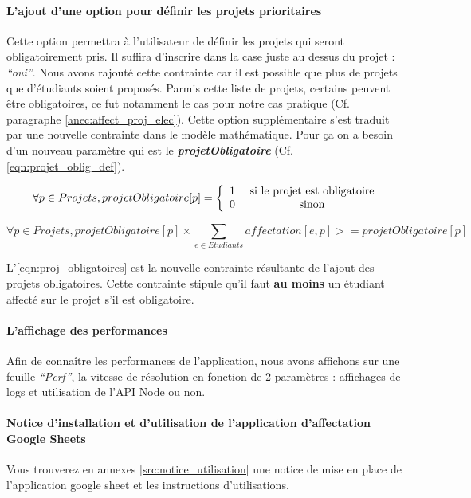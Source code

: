 \documentclass[final,poster]{polytech/polytech}
\begin{document}
\paragraph{L'ajout d'une option pour définir les projets prioritaires}
Cette option permettra à l'utilisateur de définir les projets qui seront obligatoirement pris. Il suffira d'inscrire dans la case juste au dessus du projet : \textit{“oui”}. 
Nous avons rajouté cette contrainte car il est possible que plus de projets que d'étudiants soient proposés. Parmis cette liste de projets, certains peuvent être obligatoires, ce fut notamment le cas pour notre cas pratique (Cf. paragraphe \autoref{anec:affect_proj_elec}).
Cette option supplémentaire s'est traduit par une nouvelle contrainte dans le modèle mathématique. Pour ça on a besoin d'un nouveau paramètre qui est le \textbf{\textit{projetObligatoire}} (Cf. \autoref{eqn:projet_oblig_def}).

\begin{equation}
\forall {p \in Projets}, projetObligatoire[p]=
\left\lbrace
\begin{array}{c c }
1 & \text{ si le projet est obligatoire} \\
0 & \text{ sinon}
\end{array}
\right.
\label{eqn:projet_oblig_def}
\end{equation}

\begin{equation}
\forall {p \in Projets}, projetObligatoire[p]\times\sum_{e \in Etudiants} affectation[e,p] >=projetObligatoire[p]
\label{eqn:proj_obligatoires}
\end{equation}


L'\autoref{eqn:proj_obligatoires} est la nouvelle contrainte résultante de l'ajout des projets obligatoires. Cette contrainte stipule qu'il faut \textbf{au moins} un étudiant affecté sur le projet s'il est obligatoire.

\paragraph{L'affichage des performances}
Afin de connaître les performances de l'application, nous avons affichons sur une feuille \textit{“Perf”}, la vitesse de résolution en fonction de 2 paramètres : affichages de logs et utilisation de l’API Node ou non.


\paragraph{Notice d'installation et d'utilisation de l'application d'affectation Google Sheets}
Vous trouverez en annexes \autoref{src:notice_utilisation} une notice de mise en place de l'application google sheet et les instructions d'utilisations.
\end{document}
